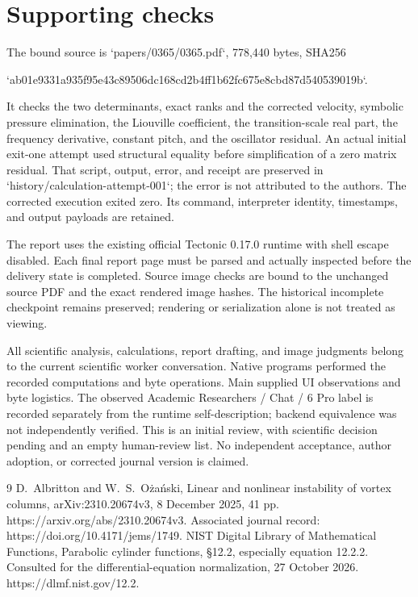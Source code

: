 \documentclass[10pt]{article}
\begin{document}
\section*{Supporting checks}
The bound source is `papers/0365/0365.pdf`, 778,440 bytes, SHA256\par
`ab01e9331a935f95e43c89506dc168cd2b4ff1b62fc675e8cbd87d540539019b`.\par
It checks the two determinants, exact ranks and the corrected velocity, symbolic pressure elimination, the Liouville coefficient, the transition-scale real part, the frequency derivative, constant pitch, and the oscillator residual. An actual initial exit-one attempt used structural equality before simplification of a zero matrix residual. That script, output, error, and receipt are preserved in `history/calculation-attempt-001`; the error is not attributed to the authors. The corrected execution exited zero. Its command, interpreter identity, timestamps, and output payloads are retained.\par
The report uses the existing official Tectonic 0.17.0 runtime with shell escape disabled. Each final report page must be parsed and actually inspected before the delivery state is completed. Source image checks are bound to the unchanged source PDF and the exact rendered image hashes. The historical incomplete checkpoint remains preserved; rendering or serialization alone is not treated as viewing.\par
All scientific analysis, calculations, report drafting, and image judgments belong to the current scientific worker conversation. Native programs performed the recorded computations and byte operations. Main supplied UI observations and byte logistics. The observed Academic Researchers / Chat / 6 Pro label is recorded separately from the runtime self-description; backend equivalence was not independently verified. This is an initial review, with scientific decision pending and an empty human-review list. No independent acceptance, author adoption, or corrected journal version is claimed.\par
9 D. Albritton and W. S. Ożański, Linear and nonlinear instability of vortex columns, arXiv:2310.20674v3, 8 December 2025, 41 pp. https://arxiv.org/abs/2310.20674v3. Associated journal record: https://doi.org/10.4171/jems/1749. NIST Digital Library of Mathematical Functions, Parabolic cylinder functions, §12.2, especially equation 12.2.2. Consulted for the differential-equation normalization, 27 October 2026. https://dlmf.nist.gov/12.2.\par
\end{document}
